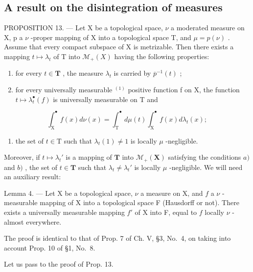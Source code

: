\subsection{A result on the disintegration of measures}

PROPOSITION 13. --- Let X be a topological space, \(\nu\) a moderated measure on X, p a \(\nu\) -proper mapping of X into a topological space T, and \(\mu = p(\nu)\) . Assume that every compact subspace of X is metrizable. Then there exists a mapping \(t \mapsto \lambda_{t}\) of T into \(\mathcal{M}_{+}(X)\) having the following properties:

\begin{enumerate}
\def\labelenumi{\alph{enumi})}
\item
  for every \(t \in \mathbf{T}\) , the measure \(\lambda_t\) is carried by \(\overline{p}^{-1}(t)\) ;
\item
  for every universally measurable \(^{(1)}\) positive function f on X, the function \(t \mapsto \lambda_{t}^{\bullet}(f)\) is universally measurable on T and
\end{enumerate}

\[
\int_ {\mathrm{X}} ^ {\bullet} f (x) d \nu (x) = \int_ {\mathrm{T}} ^ {\bullet} d \mu (t) \int_ {\mathrm{X}} ^ {\bullet} f (x) d \lambda_ {t} (x);\tag{12}
\]

\begin{enumerate}
\def\labelenumi{\alph{enumi})}
\setcounter{enumi}{2}
\tightlist
\item
  the set of \(t \in \mathrm{T}\) such that \(\lambda_t(1) \neq 1\) is locally \(\mu\) -negligible.
\end{enumerate}

Moreover, if \(t \mapsto \lambda_t'\) is a mapping of \(\mathbf{T}\) into \(\mathcal{M}_+(\mathbf{X})\) satisfying the conditions \(a)\) and \(b)\) , the set of \(t \in \mathbf{T}\) such that \(\lambda_t \neq \lambda_t'\) is locally \(\mu\) -negligible. We will need an auxiliary result:

Lemma 4. --- Let X be a topological space, \(\nu\) a measure on X, and \(f\) a \(\nu\) -measurable mapping of X into a topological space F (Hausdorff or not). There exists a universally measurable mapping \(f'\) of X into F, equal to \(f\) locally \(\nu\) -almost everywhere.

The proof is identical to that of Prop. 7 of Ch. V, §3, No.~4, on taking into account Prop. 10 of §1, No.~8.

Let us pass to the proof of Prop. 13.

